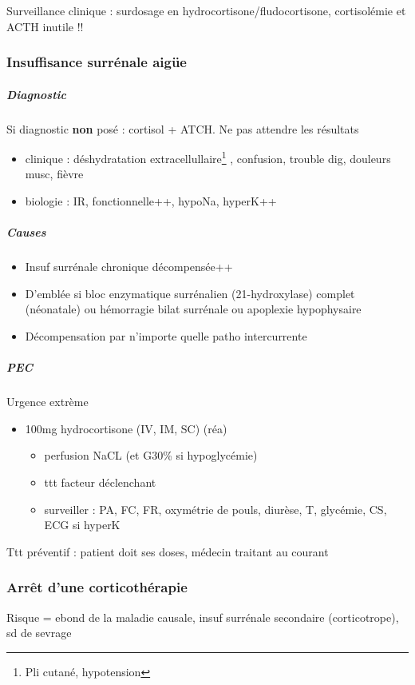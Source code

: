 \documentclass[11pt]{article}
\begin{document}
Surveillance clinique : surdosage en hydrocortisone/fludocortisone, cortisolémie et ACTH inutile !!

\subsubsection{Insuffisance surrénale aigüe}
\label{sec:orga7a5ac2}

\subparagraph{Diagnostic}
\label{sec:orgc5a4af1}
Si diagnostic \textbf{non} posé : cortisol + ATCH. Ne pas attendre les résultats 
\begin{itemize}
\item clinique : déshydratation extracellullaire\footnote{Pli cutané, hypotension} , confusion, trouble dig, douleurs musc, fièvre
\item biologie : IR, fonctionnelle++, hypoNa, hyperK++
\end{itemize}

\subparagraph{Causes}
\label{sec:orgc06ac03}
\begin{itemize}
\item Insuf surrénale chronique décompensée++
\item D'emblée si bloc enzymatique surrénalien (21-hydroxylase) complet (néonatale)
ou hémorragie bilat surrénale ou apoplexie hypophysaire
\item Décompensation par n'importe quelle patho intercurrente
\end{itemize}

\subparagraph{PEC}
\label{sec:orgc0564c4}
\danger Urgence extrème 
\begin{itemize}
\item 100mg hydrocortisone (IV, IM, SC) \thus \faHospital (réa)
\begin{itemize}
\item perfusion NaCL (et G30\% si hypoglycémie)
\item ttt facteur déclenchant
\item surveiller : PA, FC, FR, oxymétrie de pouls, diurèse, T, glycémie, CS, ECG
si hyperK
\end{itemize}
\end{itemize}

Ttt préventif : patient doit \inc ses doses, médecin traitant au courant

\subsubsection{Arrêt d'une corticothérapie}
\label{sec:org879418f}
Risque = ebond de la maladie causale, insuf surrénale secondaire (corticotrope), sd de sevrage
\end{document}
